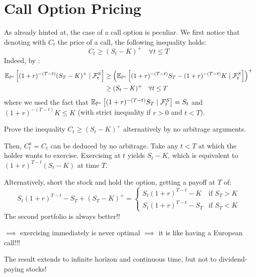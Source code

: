 
\section{Call Option Pricing}

\begin{remark}
    As already hinted at, the case of a call option is peculiar. We first notice that denoting with $C_t$ the price of a call, the following inequality holds:
    \[ C_t \geq (S_t - K)^+ \quad \forall t \leq T \]
    Indeed, by :
    \begin{align*}
        \mathbb E_{\mathbb P^*} \left[ (1+r)^{-(T-t)} (S_T - K)^+ \mid \mathcal{F}_t^S \right] &\geq \left( \mathbb E_{\mathbb P^*} \left[ (1+r)^{-(T-t)} S_T - (1+r)^{-(T-t)} K \mid \mathcal{F}_t^S \right] \right)^+ \\
        &\geq (S_t - K)^+ \quad \forall t \leq T
    \end{align*}
    where we used the fact that $\mathbb E_{\mathbb P^*} \left[ (1+r)^{-(T-t)} S_T \mid \mathcal{F}_t^S \right] = S_t$ and $(1+r)^{-(T-t)} K \leq K$ (with strict inequality if $r > 0$ and $t < T$).
\end{remark}

\begin{homework}
    Prove the inequality $C_t \geq (S_t - K)^+$ alternatively by no arbitrage arguments.
\end{homework}

\begin{remark}
    Then, $C_t^a = C_t$ can be deduced by no arbitrage. Take any $t < T$ at which the holder wants to exercise. Exercising at $t$ yields $S_t - K$, which is equivalent to $(1+r)^{T-t}(S_t - K)$ at time $T$.
    
    Alternatively, short the stock and hold the option, getting a payoff at $T$ of:
    \[ S_t (1+r)^{T-t} - S_T + (S_T - K)^+ = \begin{cases} S_t (1+r)^{T-t} - K & \text{if } S_T > K \\ S_t (1+r)^{T-t} - S_T & \text{if } S_T < K \end{cases} \]
    The second portfolio is always better!!
    
    $\implies$ exercising immediately is never optimal $\implies$ it is like having a European call!!!
    
    The result extends to infinite horizon and continuous time, but not to dividend-paying stocks!
\end{remark}

